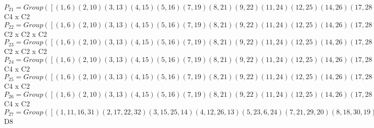 \documentclass[varwidth=\maxdimen,border=10]{standalone}
\begin{document}
\begin{tabular}
$P_{21} = Group( [ ( 1, 6)( 2,10)( 3,13)( 4,15)( 5,16)( 7,19)( 8,21)( 9,22)(11,24)(12,25)(14,26)(17,28)(18,29)(20,30)(23,31)(27,32), ( 1, 5)( 2, 9)( 3,12)( 4,14)( 6,16)( 7,18)( 8,20)(10,22)(11,23)(13,25)(15,26)(17,27)(19,29)(21,30)(24,31)(28,32), ( 1,21,16,20)( 2,15,22,14)( 3,32,25,17)( 4, 9,26,10)( 5,30, 6, 8)( 7,31,29,11)(12,28,13,27)(18,24,19,23) ] )\cong$ C4 x C2\ \\
$P_{22} = Group( [ ( 1, 6)( 2,10)( 3,13)( 4,15)( 5,16)( 7,19)( 8,21)( 9,22)(11,24)(12,25)(14,26)(17,28)(18,29)(20,30)(23,31)(27,32), ( 1, 5)( 2, 9)( 3,12)( 4,14)( 6,16)( 7,18)( 8,20)(10,22)(11,23)(13,25)(15,26)(17,27)(19,29)(21,30)(24,31)(28,32), ( 1,32)( 2,31)( 3, 8)( 4, 7)( 5,28)( 6,27)( 9,24)(10,23)(11,22)(12,20)(13,21)(14,18)(15,19)(16,17)(25,30)(26,29) ] )\cong$ C2 x C2 x C2\ \\
$P_{23} = Group( [ ( 1, 6)( 2,10)( 3,13)( 4,15)( 5,16)( 7,19)( 8,21)( 9,22)(11,24)(12,25)(14,26)(17,28)(18,29)(20,30)(23,31)(27,32), ( 1, 5)( 2, 9)( 3,12)( 4,14)( 6,16)( 7,18)( 8,20)(10,22)(11,23)(13,25)(15,26)(17,27)(19,29)(21,30)(24,31)(28,32), ( 1, 2)( 3,18)( 4,21)( 5, 9)( 6,10)( 7,12)( 8,15)(11,32)(13,29)(14,30)(16,22)(17,31)(19,25)(20,26)(23,28)(24,27) ] )\cong$ C2 x C2 x C2\ \\
$P_{24} = Group( [ ( 1, 6)( 2,10)( 3,13)( 4,15)( 5,16)( 7,19)( 8,21)( 9,22)(11,24)(12,25)(14,26)(17,28)(18,29)(20,30)(23,31)(27,32), ( 1, 5)( 2, 9)( 3,12)( 4,14)( 6,16)( 7,18)( 8,20)(10,22)(11,23)(13,25)(15,26)(17,27)(19,29)(21,30)(24,31)(28,32), ( 1,11,16,31)( 2,17,22,32)( 3,15,25,14)( 4,12,26,13)( 5,23, 6,24)( 7,21,29,20)( 8,18,30,19)( 9,27,10,28) ] )\cong$ C4 x C2\ \\
$P_{25} = Group( [ ( 1, 6)( 2,10)( 3,13)( 4,15)( 5,16)( 7,19)( 8,21)( 9,22)(11,24)(12,25)(14,26)(17,28)(18,29)(20,30)(23,31)(27,32), ( 1, 5)( 2, 9)( 3,12)( 4,14)( 6,16)( 7,18)( 8,20)(10,22)(11,23)(13,25)(15,26)(17,27)(19,29)(21,30)(24,31)(28,32), ( 1, 3, 6,13)( 2, 7,10,19)( 4,11,15,24)( 5,12,16,25)( 8,17,21,28)( 9,18,22,29)(14,23,26,31)(20,27,30,32) ] )\cong$ C4 x C2\ \\
$P_{26} = Group( [ ( 1, 6)( 2,10)( 3,13)( 4,15)( 5,16)( 7,19)( 8,21)( 9,22)(11,24)(12,25)(14,26)(17,28)(18,29)(20,30)(23,31)(27,32), ( 1, 5)( 2, 9)( 3,12)( 4,14)( 6,16)( 7,18)( 8,20)(10,22)(11,23)(13,25)(15,26)(17,27)(19,29)(21,30)(24,31)(28,32), ( 1, 4, 5,14)( 2, 8, 9,20)( 3,11,12,23)( 6,15,16,26)( 7,17,18,27)(10,21,22,30)(13,24,25,31)(19,28,29,32) ] )\cong$ C4 x C2\ \\
$P_{27} = Group( [ ( 1,11,16,31)( 2,17,22,32)( 3,15,25,14)( 4,12,26,13)( 5,23, 6,24)( 7,21,29,20)( 8,18,30,19)( 9,27,10,28), ( 1, 2)( 3,18)( 4,21)( 5, 9)( 6,10)( 7,12)( 8,15)(11,32)(13,29)(14,30)(16,22)(17,31)(19,25)(20,26)(23,28)(24,27), ( 1,16)( 2,22)( 3,25)( 4,26)( 5, 6)( 7,29)( 8,30)( 9,10)(11,31)(12,13)(14,15)(17,32)(18,19)(20,21)(23,24)(27,28) ] )\cong$ D8\ \\

\end{tabular}
\end{document}
